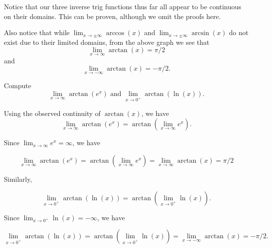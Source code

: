 \documentclass{ximera}
\begin{document}
Notice that our three inverse trig functions thus far all appear to be continuous on their domains. This can be proven, although we omit the proofs here.

Also notice that while $\displaystyle\lim_{x\rightarrow\pm\infty}\arccos(x)$ and $\displaystyle\lim_{x\rightarrow\pm\infty}\arcsin(x)$ do not exist due to their limited domains, from the above graph we see that
\[\displaystyle\lim_{x\rightarrow\infty}\arctan(x)=\pi/2\]
and 
\[\displaystyle\lim_{x\rightarrow-\infty}\arctan(x)=-\pi/2.\]

\begin{example}
Compute \[\displaystyle\lim_{x\rightarrow\infty}\arctan(e^x) \mbox{  and  }\displaystyle\lim_{x\rightarrow 0^+}\arctan(\ln(x)).\]
\begin{explanation}
Using the observed continuity of $\arctan(x)$, we have
\[\displaystyle\lim_{x\rightarrow\infty}\arctan(e^x)=\arctan\left(\lim_{x\rightarrow\infty}e^x\right).\]

Since \(\lim_{x\rightarrow\infty}e^x=\infty\), we have

\[\displaystyle\lim_{x\rightarrow\infty}\arctan(e^x)=\arctan\left(\lim_{x\rightarrow\infty}e^x\right)=\lim_{x\rightarrow\infty}\arctan(x)=\pi/2\]

Similarly,

\[\displaystyle\lim_{x\rightarrow 0^+}\arctan(\ln(x))=\arctan\left(\lim_{x\rightarrow 0^+}\ln(x)\right).\]     

Since $\lim_{x\rightarrow 0^+}\ln(x)=-\infty$, we have

\[\displaystyle\lim_{x\rightarrow 0^+}\arctan(\ln(x))=\arctan\left(\lim_{x\rightarrow 0^+}\ln(x)\right)=\lim_{x\rightarrow -\infty}\arctan(x)=-\pi/2.\]      


\end{explanation}
\end{example}
\end{document}
